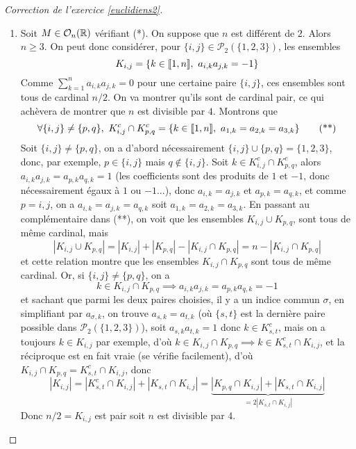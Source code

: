 \begin{proof}[Correction de l'exercice \ref{euclidiens2}]
\begin{enumerate}
		\item Soit $M\in\mathcal O_n(\operatorname{\mathbb R})$ vérifiant (*).
		On suppose que $n$ est différent de $2$. Alors $n\geq 3$.
		On peut donc considérer, pour $\lbrace i,j\rbrace\in\mathcal P_2(\lbrace1,2,3\rbrace)$, les ensembles
		\[
			K_{i,j}=\lbrace k \in\inl1n,\ a_{i,k}a_{j,k}=-1\rbrace	
		\]
		Comme $\sum_{k=1}^na_{i,k}a_{j,k}=0$ pour une certaine paire $\lbrace i,j\rbrace$, ces ensembles sont tous de cardinal $n/2$. 
		On va montrer qu'ils sont de cardinal pair, ce qui achèvera de montrer que $n$ est divisible par $4$.
		Montrons que 
		\[
			\forall \lbrace i,j\rbrace\neq\lbrace p,q\rbrace,\ K_{i,j}^c\cap K_{p,q}^c=\lbrace k\in[\![1,n]\!],\ a_{1,k}=a_{2,k}=a_{3,k}\rbrace\tag*{(**)}
		\]
		Soit $\lbrace i,j\rbrace\neq\lbrace p,q\rbrace$, on a d'abord nécessairement $\lbrace i,j\rbrace\cup\lbrace p,q\rbrace=\lbrace 1,2,3\rbrace$,
		donc, par exemple, $p\in\lbrace i,j\rbrace$ mais $q\notin \lbrace i,j\rbrace$.
		Soit $k\in K_{i,j}^c\cap K_{p,q}^c$, alors $a_{i,k}a_{j,k}=a_{p,k}a_{q,k}=1$
		(les coefficients sont des produits de $1$ et $-1$, donc nécessairement égaux à $1$ ou $-1$...),
		donc $a_{i,k}=a_{j,k}$ et $a_{p,k}=a_{q,k}$, et comme $p=i,j$, on a $a_{i,k}=a_{j,k}=a_{q,k}$ soit $a_{1,k}=a_{2,k}=a_{3,k}$.
		En passant au complémentaire dans (**), on voit que les ensembles $K_{i,j}\cup K_{p,q}$, sont tous de même cardinal, mais 
		\[
			|K_{i,j}\cup K_{p,q}|=|K_{i,j}|+|K_{p,q}|-|K_{i,j}\cap K_{p,q}|=n-|K_{i,j}\cap K_{p,q}|
		\]
		et cette relation montre que les ensembles $K_{i,j}\cap K_{p,q}$ sont tous de même cardinal.
		Or, si $\lbrace i,j\rbrace\neq\lbrace p,q\rbrace$, on a 
		\[
			k\in K_{i,j}\cap K_{p,q}\implies a_{i,k}a_{j,k}=a_{p,k}a_{q,k}=-1
		\]
		et sachant que parmi les deux paires choisies, il y a un indice commun $\sigma$, en simplifiant par $a_{\sigma,k}$,
		on trouve $a_{s,k}=a_{t,k}$ (où $\lbrace s,t\rbrace$ est la dernière paire possible dans $\mathcal P_2(\lbrace 1,2,3\rbrace)$), soit 
		$a_{s,k}a_{t,k}=1$ donc $k\in K_{s,t}^c$, mais on a toujours $k\in K_{i,j}$ par exemple, d'où $k\in K_{i,j}\cap K_{p,q}\implies k\in K_{s,t}^c\cap K_{i,j}$,
		et la réciproque est en fait vraie (se vérifie facilement), d'où $K_{i,j}\cap K_{p,q}=K_{s,t}^c\cap K_{i,j}$, donc 
		\[
			|K_{i,j}|=|K_{s,t}^c\cap K_{i,j}|+|K_{s,t}\cap K_{i,j}|=\underbrace{|K_{p,q}\cap K_{i,j}|+|K_{s,t}\cap K_{i,j}|}_{=2|K_{s,t}\cap K_{i,j}|}
		\]
		Donc $n/2=K_{i,j}$ est pair soit $n$ est divisible par $4$.
	\end{enumerate}
\end{proof}

